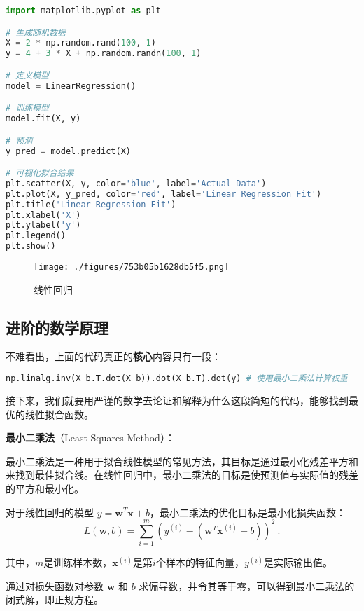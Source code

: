 \begin{lstlisting}[language=python]
import matplotlib.pyplot as plt

# 生成随机数据
X = 2 * np.random.rand(100, 1)
y = 4 + 3 * X + np.random.randn(100, 1)

# 定义模型
model = LinearRegression()

# 训练模型
model.fit(X, y)

# 预测
y_pred = model.predict(X)

# 可视化拟合结果
plt.scatter(X, y, color='blue', label='Actual Data')
plt.plot(X, y_pred, color='red', label='Linear Regression Fit')
plt.title('Linear Regression Fit')
plt.xlabel('X')
plt.ylabel('y')
plt.legend()
plt.show()
\end{lstlisting}

\begin{figure}[ht]
\centering
\texttt{[image: ./figures/753b05b1628db5f5.png]}
\caption{线性回归} \label{fig_LiGr_7}
\end{figure}

\subsection{进阶的数学原理}

不难看出，上面的代码真正的\textbf{核心}内容只有一段：

\begin{lstlisting}[language=python]
np.linalg.inv(X_b.T.dot(X_b)).dot(X_b.T).dot(y) # 使用最小二乘法计算权重
\end{lstlisting}

接下来，我们就要用严谨的数学去论证和解释为什么这段简短的代码，能够找到最优的线性拟合函数。

\textbf{最小二乘法}（Least Squares Method）：

最小二乘法是一种用于拟合线性模型的常见方法，其目标是通过最小化残差平方和来找到最佳拟合线。在线性回归中，最小二乘法的目标是使预测值与实际值的残差的平方和最小化。

对于线性回归的模型 $y = \mathbf{w}^T \mathbf{x} + b$，最小二乘法的优化目标是最小化损失函数：
\begin{equation}
L(\mathbf{w}, b) = \sum_{i=1}^{m} (y^{(i)} - (\mathbf{w}^T \mathbf{x}^{(i)} + b))^2~.
\end{equation}

其中，$m$是训练样本数，$\mathbf{x}^{(i)}$是第$i$个样本的特征向量，$y^{(i)}$是实际输出值。

通过对损失函数对参数 $\mathbf{w}$ 和 $b$ 求偏导数，并令其等于零，可以得到最小二乘法的闭式解，即正规方程。

